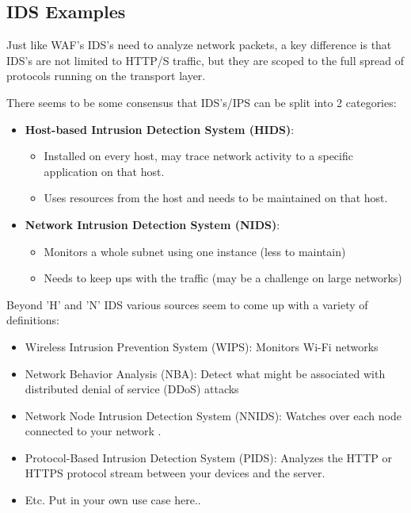 \documentclass[
	letterpaper, %
	10pt, %
	unnumberedsections, %
	twoside, %
]{APAAssignment}
\begin{document}
\subsection{IDS Examples}
Just like WAF's IDS's need to analyze network packets, a key difference is that IDS's are not limited to HTTP/S traffic, but they are scoped to the full spread of protocols running on the transport layer.

There seems to be  some consensus that IDS's/IPS can be split into 2 categories:

\begin{itemize}
	\item \textbf{Host-based Intrusion Detection System (HIDS)}: 
	\begin{itemize}
		\item Installed on every host, may trace network activity to a specific application on that host.
		\item Uses resources from the host and needs to be maintained on that host.
	\end{itemize}
	\item \textbf{Network Intrusion Detection System (NIDS)}: 
	\begin{itemize}
		\item Monitors a whole subnet using one instance (less to maintain) 
		\item Needs to keep ups with the traffic (may be a challenge on large networks)
	\end{itemize}
\end{itemize}

Beyond 'H' and 'N' IDS various sources seem to come up with a variety of definitions:

\begin{itemize}
	\item Wireless Intrusion Prevention System (WIPS):   Monitors Wi-Fi networks \cite{FortinetIPSdefinitiopns}
	\item Network Behavior Analysis (NBA): Detect what might be associated with distributed denial of service (DDoS) attacks \cite{FortinetIPSdefinitiopns}
	\item Network Node Intrusion Detection System (NNIDS): Watches over each node connected to your network \cite{HelixstormIDSdefinitiopns}.
	\item Protocol-Based Intrusion Detection System (PIDS): Analyzes the HTTP or HTTPS protocol stream between your devices and the server\cite{HelixstormIDSdefinitiopns}.
	\item Etc. Put in your own use case here..
\end{itemize}
\end{document}
